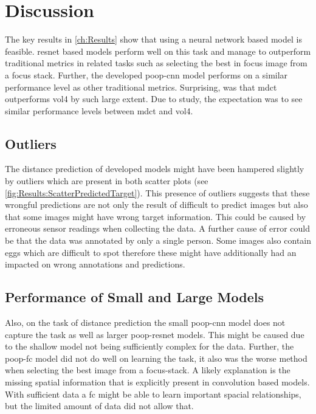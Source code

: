 \chapter{Discussion}
\label{ch:Discussion}

The key results in \autoref{ch:Results} show that using a neural network based model is feasible. \Ac{resnet} based models perform well on this task and manage to outperform traditional metrics in related tasks such as selecting the best in focus image from a focus stack. Further, the developed \ac{poop}-\ac{cnn} model performs on a similar performance level as other traditional metrics. Surprising, was that \ac{mdct} outperforms \ac{vol4} by such large extent. Due to \textcite{mateos-perez2012comparative} study, the expectation was to see similar performance levels between \ac{mdct} and \ac{vol4}.

\section{Outliers}
\label{ch:Discussion:Outliers}

The distance prediction of developed models might have been hampered slightly by outliers which are present in both scatter plots (see \autoref{fig:Results:ScatterPredictedTarget}). This presence of outliers suggests that these wrongful predictions are not only the result of difficult to predict images but also that some images might have wrong target information. This could be caused by erroneous sensor readings when collecting the data. A further cause of error could be that the data was annotated by only a single person. Some images also contain eggs which are difficult to spot therefore these might have additionally had an impacted on wrong annotations and predictions.

\section{Performance of Small and Large Models}
\label{ch:Discussion:SmallandLarge}

Also, on the task of distance prediction the small \ac{poop}-{cnn} model does not capture the task as well as larger \ac{poop}-\ac{resnet} models. This might be caused due to the shallow model not being sufficiently complex for the data. Further, the \ac{poop}-\ac{fc} model did not do well on learning the task, it also was the worse method when selecting the best image from a focus-stack. A likely explanation is the missing spatial information that is explicitly present in convolution based models. With sufficient data a \ac{fc} might be able to learn important spacial relationships, but the limited amount of data did not allow that.


